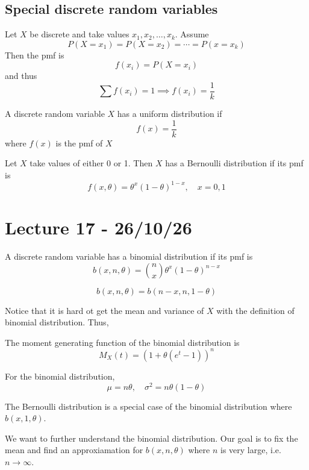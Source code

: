 \documentclass[11pt]{article}
\begin{document}
\subsection{Special discrete random variables}
Let $X$ be discrete and take values $x_1,x_2, \dots, x_k$. Assume
\[
    P(X=x_1) = P(X=x_2) = \cdots = P(x=x_k)
\]
Then the pmf is 
\[
    f(x_i) = P(X=x_i)
\]
and thus 
\[
    \sum f(x_i) = 1 \implies f(x_i) = \frac{1}{k}
\]
\begin{definition}
    A discrete random variable $X$ has a uniform distribution if 
    \[
        f(x) = \frac{1}{k}
    \]
    where $f(x)$ is the pmf of $X$
\end{definition}
\begin{definition}
    Let $X$ take values of either 0 or 1. Then $X$ has a Bernoulli distribution if its pmf is 
    \[
        f(x,\theta) = \theta^x (1-\theta)^{1-x},\quad x = 0,1
    \]
    
\end{definition}
\section{Lecture 17 - 26/10/26}
\begin{definition}
    A discrete random variable has a binomial distribution if its pmf is 
    \[
        b(x,n,\theta) = \binom{n}{x} \theta^x (1-\theta)^{n-x}
    \]
     
\end{definition}
\begin{theorem}
   \[
        b(x,n,\theta) = b(n-x,n,1-\theta)
   \]
\end{theorem}
Notice that it is hard ot get the mean and variance of $X$ with the definition of binomial distribution. Thus,
\begin{theorem}
    The moment generating function of the binomial distribution is
    \[
        M_X(t) = (1+\theta(e^t-1))^n
    \]
    
\end{theorem}
\begin{theorem}
    For the binomial distribution,
    \[
        \mu = n\theta, \quad \sigma^2  = n\theta(1-\theta)
    \]
    
\end{theorem}
\begin{remark}
    The Bernoulli distribution is a special case of the binomial distribution where $b(x,1,\theta)$.
\end{remark}
We want to further understand the binomial distribution. Our goal is to fix the mean and find an approxiamation for $b(x,n,\theta)$ where $n$ is very large, i.e. $n \rightarrow \infty$.
\end{document}
